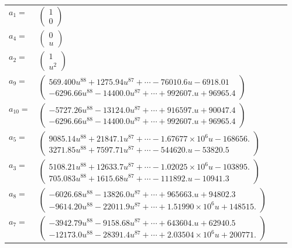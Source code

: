 \documentclass[1p]{elsarticle_modified}
\theoremstyle{definition}
\begin{document}
\begin{tabular}{m{7pt} m{180pt} m{7pt} m{180pt} }
\flushright $a_{1}=$&$\begin{pmatrix}1\\0\end{pmatrix}$ \\
\flushright $a_{4}=$&$\begin{pmatrix}0\\u\end{pmatrix}$ \\
\flushright $a_{2}=$&$\begin{pmatrix}1\\u^2\end{pmatrix}$ \\
\flushright $a_{9}=$&$\begin{pmatrix}569.400 u^{88}+1275.94 u^{87}+\cdots-76010.6 u-6918.01\\-6296.66 u^{88}-14400.0 u^{87}+\cdots+992607. u+96965.4\end{pmatrix}$ \\
\flushright $a_{10}=$&$\begin{pmatrix}-5727.26 u^{88}-13124.0 u^{87}+\cdots+916597. u+90047.4\\-6296.66 u^{88}-14400.0 u^{87}+\cdots+992607. u+96965.4\end{pmatrix}$ \\
\flushright $a_{5}=$&$\begin{pmatrix}9085.14 u^{88}+21847.1 u^{87}+\cdots-1.67677\times10^{6} u-168656.\\3271.85 u^{88}+7597.71 u^{87}+\cdots-544620. u-53820.5\end{pmatrix}$ \\
\flushright $a_{3}=$&$\begin{pmatrix}5108.21 u^{88}+12633.7 u^{87}+\cdots-1.02025\times10^{6} u-103895.\\705.083 u^{88}+1615.68 u^{87}+\cdots-111892. u-10941.3\end{pmatrix}$ \\
\flushright $a_{8}=$&$\begin{pmatrix}-6026.68 u^{88}-13826.0 u^{87}+\cdots+965663. u+94802.3\\-9614.20 u^{88}-22011.9 u^{87}+\cdots+1.51990\times10^{6} u+148515.\end{pmatrix}$ \\
\flushright $a_{7}=$&$\begin{pmatrix}-3942.79 u^{88}-9158.68 u^{87}+\cdots+643604. u+62940.5\\-12173.0 u^{88}-28391.4 u^{87}+\cdots+2.03504\times10^{6} u+200771.\end{pmatrix}$ \\

\end{tabular}
\end{document}
